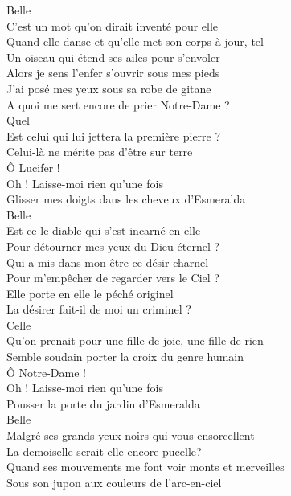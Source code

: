 \documentclass{novel}
\begin{document}
\begin{multicols}{2}
Belle \\
C'est un mot qu'on dirait inventé pour elle \\
Quand elle danse et qu'elle met son corps à jour, tel \\
Un oiseau qui étend ses ailes pour s'envoler \\
Alors je sens l'enfer s'ouvrir sous mes pieds \\

J'ai posé mes yeux sous sa robe de gitane \\
A quoi me sert encore de prier Notre-Dame ? \\
Quel \\
Est celui qui lui jettera la première pierre ? \\
Celui-là ne mérite pas d'être sur terre \\

Ô Lucifer ! \\
Oh ! Laisse-moi rien qu'une fois \\
Glisser mes doigts dans les cheveux d'Esmeralda \\

Belle \\
Est-ce le diable qui s'est incarné en elle \\
Pour détourner mes yeux du Dieu éternel ? \\
Qui a mis dans mon être ce désir charnel \\
Pour m'empêcher de regarder vers le Ciel ? \\

Elle porte en elle le péché originel \\
La désirer fait-il de moi un criminel ? \\
Celle \\
Qu'on prenait pour une fille de joie, une fille de rien \\
Semble soudain porter la croix du genre humain \\

Ô Notre-Dame ! \\
Oh ! Laisse-moi rien qu'une fois \\
Pousser la porte du jardin d'Esmeralda \\

Belle \\
Malgré ses grands yeux noirs qui vous ensorcellent \\
La demoiselle serait-elle encore pucelle? \\
Quand ses mouvements me font voir monts et merveilles \\
Sous son jupon aux couleurs de l'arc-en-ciel \\


\end{multicols}
\end{document}

